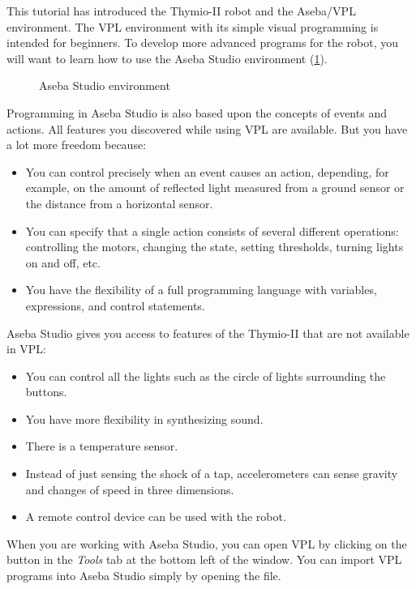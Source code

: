 
\label{ch.next}

This tutorial has introduced the Thymio-II robot and the Aseba/VPL
environment. The VPL environment with its simple visual programming is
intended for beginners. To develop more advanced programs for the robot,
you will want to learn how to use the Aseba Studio environment (\cref{fig.studio}).

\begin{figure}[hbt]
\begin{center}
\caption{Aseba Studio environment}\label{fig.studio}
\end{center}
\end{figure}

Programming in Aseba Studio is also based upon the concepts of events
and actions.
All features you discovered while using VPL are available.
But you have a lot more freedom because:
\begin{itemize}
\item You can control precisely when an event causes an action, depending, for
example, on the amount of reflected light measured from a ground sensor or
the distance from a horizontal sensor.
\item You can specify that a single action consists of several different
operations: controlling the motors, changing the state, setting
thresholds, turning lights on and off, etc.
\item You have the flexibility of a full programming language with
variables, expressions, and control statements.
\end{itemize}

Aseba Studio gives you access to features of the Thymio-II that are not
available in VPL:

\begin{itemize}
\item You can control all the lights such as the circle of lights
surrounding the buttons.
\item You have more flexibility in synthesizing sound.
\item There is a temperature sensor.
\item Instead of just sensing the shock of a tap, accelerometers
can sense gravity and changes of speed in three dimensions.
\item A remote control device can be used with the robot.
\end{itemize}
When you are working with Aseba Studio, you can open VPL by clicking on
the button  in the \emph{Tools} tab at the bottom left of the window.
You can import VPL programs into Aseba Studio simply by opening the file.

